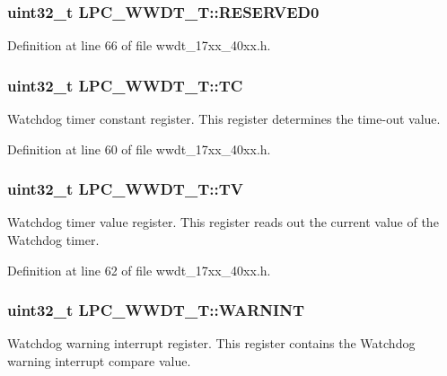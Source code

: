 \subsubsection[{\texorpdfstring{R\+E\+S\+E\+R\+V\+E\+D0}{RESERVED0}}]{ uint32\+\_\+t L\+P\+C\+\_\+\+W\+W\+D\+T\+\_\+\+T\+::\+R\+E\+S\+E\+R\+V\+E\+D0}\hypertarget{structLPC__WWDT__T_af47cdcbd1ae7b068bf6b66566a140aa6}{}\label{structLPC__WWDT__T_af47cdcbd1ae7b068bf6b66566a140aa6}


Definition at line 66 of file wwdt\+\_\+17xx\+\_\+40xx.\+h.

\subsubsection[{\texorpdfstring{TC}{TC}}]{ uint32\+\_\+t L\+P\+C\+\_\+\+W\+W\+D\+T\+\_\+\+T\+::\+TC}\hypertarget{structLPC__WWDT__T_a8390ac91aea3330b363ad2fd5dc97f98}{}\label{structLPC__WWDT__T_a8390ac91aea3330b363ad2fd5dc97f98}
Watchdog timer constant register. This register determines the time-\/out value. 

Definition at line 60 of file wwdt\+\_\+17xx\+\_\+40xx.\+h.

\subsubsection[{\texorpdfstring{TV}{TV}}]{ uint32\+\_\+t L\+P\+C\+\_\+\+W\+W\+D\+T\+\_\+\+T\+::\+TV}\hypertarget{structLPC__WWDT__T_a8257032e074282d5242e1d2a07537db1}{}\label{structLPC__WWDT__T_a8257032e074282d5242e1d2a07537db1}
Watchdog timer value register. This register reads out the current value of the Watchdog timer. 

Definition at line 62 of file wwdt\+\_\+17xx\+\_\+40xx.\+h.

\subsubsection[{\texorpdfstring{W\+A\+R\+N\+I\+NT}{WARNINT}}]{ uint32\+\_\+t L\+P\+C\+\_\+\+W\+W\+D\+T\+\_\+\+T\+::\+W\+A\+R\+N\+I\+NT}\hypertarget{structLPC__WWDT__T_a6efaed3716fc4661ef3a7a52bcc9028a}{}\label{structLPC__WWDT__T_a6efaed3716fc4661ef3a7a52bcc9028a}
Watchdog warning interrupt register. This register contains the Watchdog warning interrupt compare value. 

